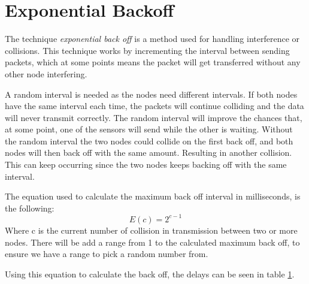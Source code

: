 \section{Exponential Backoff}\label{cha:expbackoff}
The technique \textit{exponential back off} is a method used for handling interference or collisions. This technique works by incrementing the interval between sending packets, which at some points means the packet will get transferred without any other node interfering. 

A random interval is needed as the nodes need different intervals. If both nodes have the same interval each time, the packets will continue colliding and the data will never transmit correctly. The random interval will improve the chances that, at some point, one of the sensors will send while the other is waiting. 
Without the random interval the two nodes could collide on the first back off, and both nodes will then back off with the same amount. Resulting in another collision. This can keep occurring since the two nodes keeps backing off with the same interval.

The equation used to calculate the maximum back off interval in milliseconds, is the following:
\begin{equation}
E(c)=2^{c-1}
\end{equation}
Where c is the current number of collision in transmission between two or more nodes.
There will be add a range from 1 to the calculated maximum back off, to ensure we have a range to pick a random number from.

Using this equation to calculate the back off, the delays can be seen in table \ref{cha:expbackoff}.

